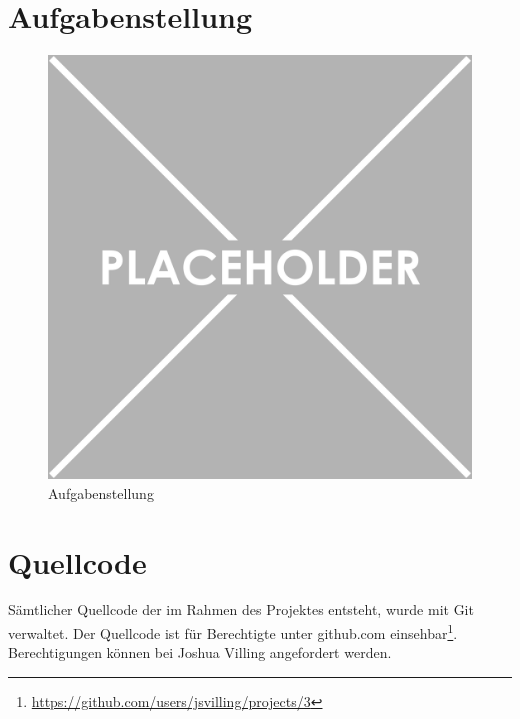 \renewcommand\refname{Literaturverzeichnis}
\printbibliography
\cleardoublepage
\listoffigures

\appendix
\clearpage
\section{Aufgabenstellung}\label{sec:aufgabenstellung}
\begin{figure}[h]
    \centering
    \begin{minipage}[b]{0.8\textwidth}
        \includegraphics[width=\textwidth]{graphics/placeholder}
        \caption{Aufgabenstellung}
    \end{minipage}\label{fig:aufgabenstellung}
\end{figure}

\clearpage

\section{Quellcode}\label{sec:quellcode}

Sämtlicher Quellcode der im Rahmen des Projektes entsteht, wurde mit Git verwaltet. Der Quellcode ist für Berechtigte unter github.com einsehbar\footnote{\url{https://github.com/users/jsvilling/projects/3}}.
Berechtigungen können bei Joshua Villing angefordert werden.

\clearpage



